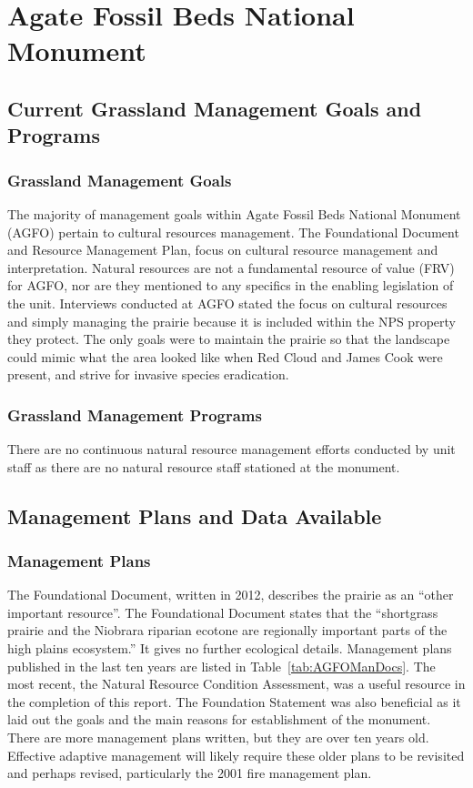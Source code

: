 \section{Agate Fossil Beds National Monument}

\subsection{Current Grassland Management Goals and Programs}

\subsubsection{Grassland Management Goals}

The majority of management goals within Agate Fossil Beds National
Monument (AGFO) pertain to cultural resources management. The
Foundational Document and Resource Management Plan, focus on cultural
resource management and interpretation. Natural resources are not a
fundamental resource of value (FRV) for AGFO, nor are they mentioned to
any specifics in the enabling legislation of the unit. Interviews
conducted at AGFO stated the focus on cultural resources and simply
managing the prairie because it is included within the NPS property they
protect. The only goals were to maintain the prairie so that the
landscape could mimic what the area looked like when Red Cloud and James
Cook were present, and strive for invasive species eradication.

\subsubsection{Grassland Management Programs}

There are no continuous natural resource management efforts conducted by
unit staff as there are no natural resource staff stationed at the
monument.

\subsection{Management Plans and Data Available}

\subsubsection{Management Plans}

The Foundational Document, written in 2012, describes the prairie as an ``other important resource''. 
The Foundational Document states that the ``shortgrass prairie and the Niobrara riparian ecotone are regionally important parts of the high plains ecosystem.'' 
It gives no further ecological details. 
Management plans published in the last ten years are listed in Table~\ref{tab:AGFOManDocs}. 
The most recent, the Natural Resource Condition Assessment, was a useful resource in the completion of this report. 
The Foundation Statement was also beneficial as it laid out the goals and the main reasons for establishment of the monument. 
There are more management plans written, but they are over ten years old.
Effective adaptive management will likely require these older plans to be revisited and perhaps revised, particularly the 2001 fire management plan.

